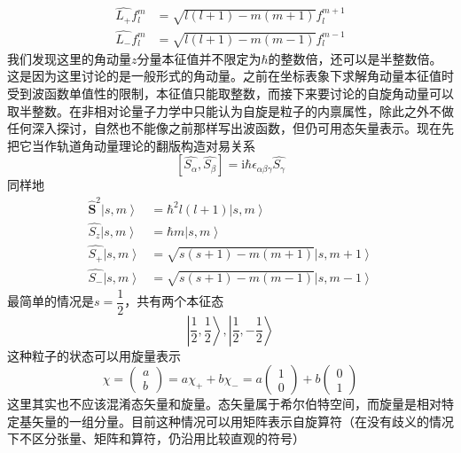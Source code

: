 \documentclass[12pt, a4paper, oneside]{ctexart}
\begin{document}
	\begin{align}
		\hat{L_{+}}f^{m}_{l}&=\sqrt{l(l+1)-m(m+1)}f^{m+1}_{l}\\
		\hat{L_{-}}f^{m}_{l}&=\sqrt{l(l+1)-m(m-1)}f^{m-1}_{l}
	\end{align}
	\quad\quad 我们发现这里的角动量$z$分量本征值并不限定为$\hbar$的整数倍，还可以是半整数倍。这是因为这里讨论的是一般形式的角动量。之前在坐标表象下求解角动量本征值时受到波函数单值性的限制，本征值只能取整数，而接下来要讨论的自旋角动量可以取半整数。在非相对论量子力学中只能认为自旋是粒子的内禀属性，除此之外不做任何深入探讨，自然也不能像之前那样写出波函数，但仍可用态矢量表示。现在先把它当作轨道角动量理论的翻版构造对易关系
	\begin{equation}
		\left[\hat{S_{\alpha}},\hat{S_{\beta}}\right]=\mathrm{i}\hbar \epsilon_{\alpha\beta\gamma}\hat{S_{\gamma}}
	\end{equation}
	\quad\quad 同样地
	\begin{align}
		\boldsymbol{\hat{S}}^{2}\left|s,m\right>&=\hbar^{2}l(l+1)\left|s,m\right>\\
		\hat{S_{z}}\left|s,m\right>&=\hbar m\left|s,m\right>\\
		\hat{S_{+}}\left|s,m\right>&=\sqrt{s(s+1)-m(m+1)}\left|s,m+1\right>\\
		\hat{S_{-}}\left|s,m\right>&=\sqrt{s(s+1)-m(m-1)}\left|s,m-1\right>
	\end{align}
	\quad\quad 最简单的情况是$s=\dfrac{1}{2}$，共有两个本征态
	\begin{equation}
		\left|\dfrac{1}{2},\dfrac{1}{2}\right>,\left|\dfrac{1}{2},-\dfrac{1}{2}\right>
	\end{equation}
	\quad\quad 这种粒子的状态可以用旋量表示
	\begin{equation}
		\chi=\begin{pmatrix}
			a\\b
		\end{pmatrix}
		=a\chi_{+}+b\chi_{-}=a\begin{pmatrix}
			1\\0
		\end{pmatrix}+b\begin{pmatrix}
		0\\1
		\end{pmatrix}
	\end{equation}
	\quad\quad 这里其实也不应该混淆态矢量和旋量。态矢量属于希尔伯特空间，而旋量是相对特定基矢量的一组分量。目前这种情况可以用矩阵表示自旋算符（在没有歧义的情况下不区分张量、矩阵和算符，仍沿用比较直观的符号）
\end{document}
